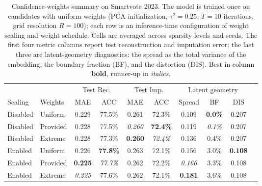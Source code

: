 \begin{table}[t]
\centering
\caption{Confidence-weights summary on Smartvote 2023. The model is trained once on candidates with uniform weights (PCA initialization, $\tau^2 = 0.25$, $T = 10$ iterations, grid resolution $R = 100$); each row is an inference-time configuration of weight scaling and weight schedule. Cells are averaged across sparsity levels and seeds. The first four metric columns report test reconstruction and imputation error; the last three are latent-geometry diagnostics: the spread as the total variance of the embedding, the boundary fraction (BF), and the distortion (DIS). Best in column \textbf{bold}, runner-up in \textit{italics}.}
\label{tab:weights_smartvote_2023}
\small
\begin{tabular}{llcccccccc}
\toprule
 & & \multicolumn{2}{c}{Test Rec.} & \multicolumn{2}{c}{Test Imp.} & \multicolumn{3}{c}{Latent geometry} \\
\cmidrule(lr){3-4}\cmidrule(lr){5-6}\cmidrule(lr){7-9}
Scaling & Weights & MAE & ACC & MAE & ACC & Spread & BF & DIS \\
\midrule
Disabled & Uniform & 0.229 & 77.5\% & 0.261 & 72.3\% & 0.109 & \textbf{0.0\%} & 0.207 \\
Disabled & Provided & 0.228 & 77.5\% & \textit{0.260} & \textbf{72.4\%} & 0.119 & \textit{0.1\%} & 0.207 \\
Disabled & Extreme & 0.228 & 77.3\% & \textbf{0.260} & \textit{72.4\%} & 0.136 & 0.4\% & 0.207 \\
\midrule
Enabled & Uniform & 0.226 & \textbf{77.8\%} & 0.263 & 72.1\% & 0.156 & 3.0\% & \textbf{0.108} \\
Enabled & Provided & \textbf{0.225} & \textit{77.7\%} & 0.262 & 72.2\% & \textit{0.166} & 3.3\% & 0.108 \\
Enabled & Extreme & \textit{0.225} & 77.6\% & 0.262 & 72.1\% & \textbf{0.181} & 3.6\% & 0.108 \\
\bottomrule
\end{tabular}
\end{table}
